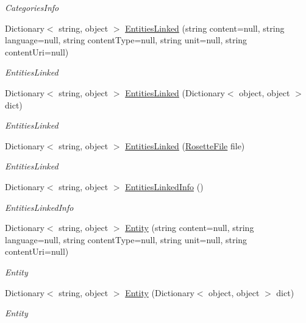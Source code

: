 \begin{DoxyCompactItemize}
\begin{DoxyCompactList}\small\item\em Categories\+Info \end{DoxyCompactList}\item 
Dictionary$<$ string, object $>$ \hyperlink{classrosette__api_1_1_c_a_p_i_a93284702782c1b4bdde4b819870eb2da}{Entities\+Linked} (string content=null, string language=null, string content\+Type=null, string unit=null, string content\+Uri=null)
\begin{DoxyCompactList}\small\item\em Entities\+Linked \end{DoxyCompactList}\item 
Dictionary$<$ string, object $>$ \hyperlink{classrosette__api_1_1_c_a_p_i_aa6073a6b30938e088d1d23e76b50ff9f}{Entities\+Linked} (Dictionary$<$ object, object $>$ dict)
\begin{DoxyCompactList}\small\item\em Entities\+Linked \end{DoxyCompactList}\item 
Dictionary$<$ string, object $>$ \hyperlink{classrosette__api_1_1_c_a_p_i_ac8f4e67f9c37b26e3ad5a4ec2723862b}{Entities\+Linked} (\hyperlink{classrosette__api_1_1_rosette_file}{Rosette\+File} file)
\begin{DoxyCompactList}\small\item\em Entities\+Linked \end{DoxyCompactList}\item 
Dictionary$<$ string, object $>$ \hyperlink{classrosette__api_1_1_c_a_p_i_abfbd332b22b386b8da8402958a68f2d1}{Entities\+Linked\+Info} ()
\begin{DoxyCompactList}\small\item\em Entities\+Linked\+Info \end{DoxyCompactList}\item 
Dictionary$<$ string, object $>$ \hyperlink{classrosette__api_1_1_c_a_p_i_a297b73d711955c8fd36f3612c603f24b}{Entity} (string content=null, string language=null, string content\+Type=null, string unit=null, string content\+Uri=null)
\begin{DoxyCompactList}\small\item\em Entity \end{DoxyCompactList}\item 
Dictionary$<$ string, object $>$ \hyperlink{classrosette__api_1_1_c_a_p_i_a292bec5be6f2dddfcfc7a681df905e26}{Entity} (Dictionary$<$ object, object $>$ dict)
\begin{DoxyCompactList}\small\item\em Entity \end{DoxyCompactList}\item 

\end{DoxyCompactItemize}
